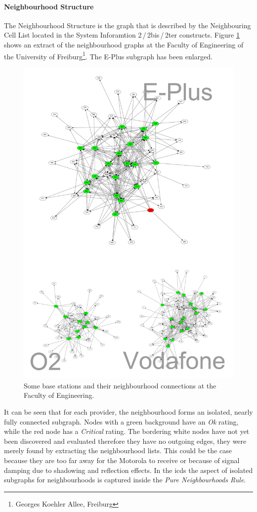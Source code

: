 \paragraph{Neighbourhood Structure}
The Neighbourhood Structure is the graph that is described by the Neighbouring Cell List located in the System Inforamtion 2\,/\,2bis\,/\,2ter constructs.
Figure \ref{fig:neighbourhood_example} shows an extract of the neighbourhood graphs at the Faculty of Engineering of the University of Freiburg\footnote{Georges Koehler Allee, Freiburg}.
The E-Plus subgraph has been enlarged.
\begin{figure}
\centering
\includegraphics[width=.9\textwidth]{../Images/neighbourhoods_fak}
\caption{Some base stations and their neighbourhood connections at the Faculty of Engineering.}
\label{fig:neighbourhood_example}
\end{figure}
It can be seen that for each provider, the neighbourhood forms an isolated, nearly fully connected subgraph.
Nodes with a green background have an \emph{Ok} rating, while the red node has a \emph{Critical} rating.
The bordering white nodes have not yet been discovered and evaluated therefore they have no outgoing edges, they were merely found by extracting the neighbourhood lists.
This could be the case because they are too far away for the Motorola to receive or because of signal damping due to shadowing and reflection effects.
In the \gls{icds} the aspect of isolated subgraphs for neighbourhoods is captured inside the \emph{Pure Neighbourhoods Rule}.

